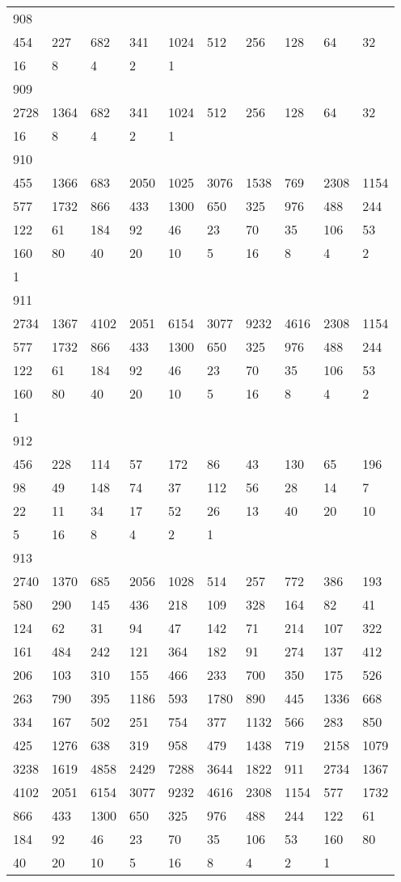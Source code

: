\begin{longtable}{*{10}{l}}
908&&&&&&&&&\\
454& 227& 682& 341& 1024& 512& 256& 128& 64& 32\\
16& 8& 4& 2& 1& \\

909&&&&&&&&&\\
2728& 1364& 682& 341& 1024& 512& 256& 128& 64& 32\\
16& 8& 4& 2& 1& \\

910&&&&&&&&&\\
455& 1366& 683& 2050& 1025& 3076& 1538& 769& 2308& 1154\\
577& 1732& 866& 433& 1300& 650& 325& 976& 488& 244\\
122& 61& 184& 92& 46& 23& 70& 35& 106& 53\\
160& 80& 40& 20& 10& 5& 16& 8& 4& 2\\
1& \\

911&&&&&&&&&\\
2734& 1367& 4102& 2051& 6154& 3077& 9232& 4616& 2308& 1154\\
577& 1732& 866& 433& 1300& 650& 325& 976& 488& 244\\
122& 61& 184& 92& 46& 23& 70& 35& 106& 53\\
160& 80& 40& 20& 10& 5& 16& 8& 4& 2\\
1& \\

912&&&&&&&&&\\
456& 228& 114& 57& 172& 86& 43& 130& 65& 196\\
98& 49& 148& 74& 37& 112& 56& 28& 14& 7\\
22& 11& 34& 17& 52& 26& 13& 40& 20& 10\\
5& 16& 8& 4& 2& 1& \\

913&&&&&&&&&\\
2740& 1370& 685& 2056& 1028& 514& 257& 772& 386& 193\\
580& 290& 145& 436& 218& 109& 328& 164& 82& 41\\
124& 62& 31& 94& 47& 142& 71& 214& 107& 322\\
161& 484& 242& 121& 364& 182& 91& 274& 137& 412\\
206& 103& 310& 155& 466& 233& 700& 350& 175& 526\\
263& 790& 395& 1186& 593& 1780& 890& 445& 1336& 668\\
334& 167& 502& 251& 754& 377& 1132& 566& 283& 850\\
425& 1276& 638& 319& 958& 479& 1438& 719& 2158& 1079\\
3238& 1619& 4858& 2429& 7288& 3644& 1822& 911& 2734& 1367\\
4102& 2051& 6154& 3077& 9232& 4616& 2308& 1154& 577& 1732\\
866& 433& 1300& 650& 325& 976& 488& 244& 122& 61\\
184& 92& 46& 23& 70& 35& 106& 53& 160& 80\\
40& 20& 10& 5& 16& 8& 4& 2& 1& \\


\end{longtable}
